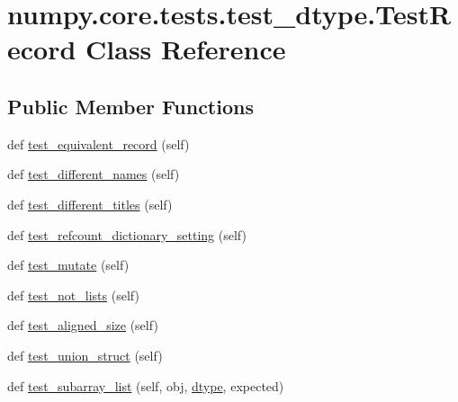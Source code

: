 \hypertarget{classnumpy_1_1core_1_1tests_1_1test__dtype_1_1TestRecord}{}\section{numpy.\+core.\+tests.\+test\+\_\+dtype.\+Test\+Record Class Reference}
\label{classnumpy_1_1core_1_1tests_1_1test__dtype_1_1TestRecord}
\subsection*{Public Member Functions}
\begin{DoxyCompactItemize}
\item 
def \hyperlink{classnumpy_1_1core_1_1tests_1_1test__dtype_1_1TestRecord_aa54cd88089e878ff41d10346f14b4c6d}{test\+\_\+equivalent\+\_\+record} (self)
\item 
def \hyperlink{classnumpy_1_1core_1_1tests_1_1test__dtype_1_1TestRecord_aaa47f542de9006225ba36bcbb9331668}{test\+\_\+different\+\_\+names} (self)
\item 
def \hyperlink{classnumpy_1_1core_1_1tests_1_1test__dtype_1_1TestRecord_acb89e400e8616a04965a1413c093fab2}{test\+\_\+different\+\_\+titles} (self)
\item 
def \hyperlink{classnumpy_1_1core_1_1tests_1_1test__dtype_1_1TestRecord_a74ae768b0a49e1abfb466293d725343a}{test\+\_\+refcount\+\_\+dictionary\+\_\+setting} (self)
\item 
def \hyperlink{classnumpy_1_1core_1_1tests_1_1test__dtype_1_1TestRecord_a54d26e7a6abe16605c84ace9d0895807}{test\+\_\+mutate} (self)
\item 
def \hyperlink{classnumpy_1_1core_1_1tests_1_1test__dtype_1_1TestRecord_acf373b21f8b9c2a69fd999e1d93268bb}{test\+\_\+not\+\_\+lists} (self)
\item 
def \hyperlink{classnumpy_1_1core_1_1tests_1_1test__dtype_1_1TestRecord_a864221d7b775423e83fbf88bb044e09f}{test\+\_\+aligned\+\_\+size} (self)
\item 
def \hyperlink{classnumpy_1_1core_1_1tests_1_1test__dtype_1_1TestRecord_a1477fca685163783837c5d0c4b4b2e77}{test\+\_\+union\+\_\+struct} (self)
\item 
def \hyperlink{classnumpy_1_1core_1_1tests_1_1test__dtype_1_1TestRecord_afefd9194ac7488f91e9c7213802a7e1d}{test\+\_\+subarray\+\_\+list} (self, obj, \hyperlink{classnumpy_1_1core_1_1tests_1_1test__dtype_1_1TestRecord_a284884905b84346bb255a12133150369}{dtype}, expected)

\end{DoxyCompactItemize}

